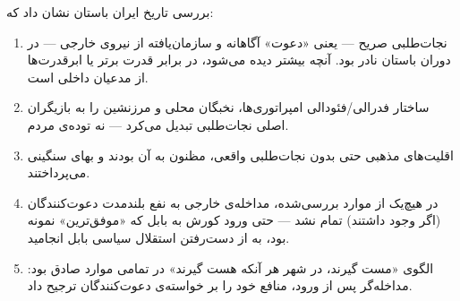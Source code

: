 بررسی تاریخ ایران باستان نشان داد که:

\begin{enumerate}[nosep, label=\textbf{\arabic*.}]
  \item نجات‌طلبی صریح — یعنی «دعوت» آگاهانه و سازمان‌یافته از نیروی خارجی — در دوران باستان نادر بود. آنچه بیشتر دیده می‌شود،  در برابر قدرت برتر یا  ابرقدرت‌ها از مدعیان داخلی است.

  \item ساختار فدرالی/فئودالی امپراتوری‌ها، نخبگان محلی و مرزنشین را به بازیگران اصلی نجات‌طلبی تبدیل می‌کرد — نه توده‌ی مردم.

  \item اقلیت‌های مذهبی حتی بدون نجات‌طلبی واقعی، مظنون به آن بودند و بهای سنگینی می‌پرداختند.

  \item در هیچ‌یک از موارد بررسی‌شده، مداخله‌ی خارجی به نفع بلندمدت دعوت‌کنندگان (اگر وجود داشتند) تمام نشد — حتی ورود کورش به بابل که «موفق‌ترین» نمونه بود، به از دست‌رفتن استقلال سیاسی بابل انجامید.

  \item الگوی «مست گیرند، در شهر هر آنکه هست گیرند» در تمامی موارد صادق بود: مداخله‌گر پس از ورود، منافع خود را بر خواسته‌ی دعوت‌کنندگان ترجیح داد.
\end{enumerate}

\cleardoublepage